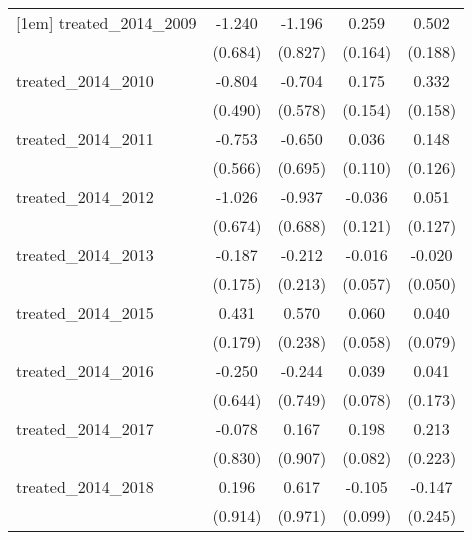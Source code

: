 {\begin{tabular}{l*{4}{c}}
[1em]
treated\_2014\_2009&      -1.240         &      -1.196         &       0.259         &       0.502\sym{**} \\
            &     (0.684)         &     (0.827)         &     (0.164)         &     (0.188)         \\
[1em]
treated\_2014\_2010&      -0.804         &      -0.704         &       0.175         &       0.332\sym{*}  \\
            &     (0.490)         &     (0.578)         &     (0.154)         &     (0.158)         \\
[1em]
treated\_2014\_2011&      -0.753         &      -0.650         &       0.036         &       0.148         \\
            &     (0.566)         &     (0.695)         &     (0.110)         &     (0.126)         \\
[1em]
treated\_2014\_2012&      -1.026         &      -0.937         &      -0.036         &       0.051         \\
            &     (0.674)         &     (0.688)         &     (0.121)         &     (0.127)         \\
[1em]
treated\_2014\_2013&      -0.187         &      -0.212         &      -0.016         &      -0.020         \\
            &     (0.175)         &     (0.213)         &     (0.057)         &     (0.050)         \\
[1em]
treated\_2014\_2015&       0.431\sym{*}  &       0.570\sym{*}  &       0.060         &       0.040         \\
            &     (0.179)         &     (0.238)         &     (0.058)         &     (0.079)         \\
[1em]
treated\_2014\_2016&      -0.250         &      -0.244         &       0.039         &       0.041         \\
            &     (0.644)         &     (0.749)         &     (0.078)         &     (0.173)         \\
[1em]
treated\_2014\_2017&      -0.078         &       0.167         &       0.198\sym{*}  &       0.213         \\
            &     (0.830)         &     (0.907)         &     (0.082)         &     (0.223)         \\
[1em]
treated\_2014\_2018&       0.196         &       0.617         &      -0.105         &      -0.147         \\
            &     (0.914)         &     (0.971)         &     (0.099)         &     (0.245)         \\

\end{tabular}}
